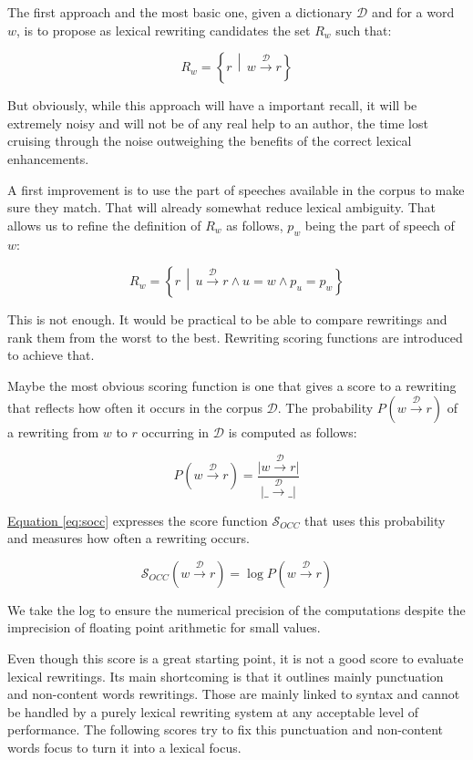 \documentclass[a4paper, 11pt, onepage]{scrreprt}
\newcommand\equaref[1]{\hyperref[#1]{Equation \ref*{#1}}}
\newcommand\maps[1]{\xrightarrow{\mathcal{#1}}}
\newcommand\card[1]{\lvert #1 \rvert}
\newcommand\suchthat{\, \middle| \,}
\newcommand\proba[2][]{P_{#1} \left( #2 \right)}
\begin{document}
The first approach and the most basic one, given a dictionary
$\mathcal{D}$ and for a word $w$, is to propose as lexical rewriting
candidates the set $R_w$ such that:

\[
R_w = \left\{r \suchthat w \maps{D} r\right\}
\]

But obviously, while this approach will have a important recall, it
will be extremely noisy and will not be of any real help to an author,
the time lost cruising through the noise outweighing the benefits of
the correct lexical enhancements.

A first improvement is to use the part of speeches available in the
corpus to make sure they match. That will already somewhat reduce
lexical ambiguity. That allows us to refine the definition of $R_w$ as
follows, $p_w$ being the part of speech of $w$:

\begin{equation*}
  R_w = \left\{
    r \suchthat u \maps{D} r \land u = w \land p_u = p_w
  \right\}
\end{equation*}

This is not enough. It would be practical to be able to compare
rewritings and rank them from the worst to the best. Rewriting scoring
functions are introduced to achieve that.

Maybe the most obvious scoring function is one that gives a score to a
rewriting that reflects how often it occurs in the corpus
$\mathcal{D}$. The probability $\proba{w \maps{D} r}$ of a rewriting
from $w$ to $r$ occurring in $\mathcal{D}$ is computed as follows:

\begin{equation*}
  \proba{w \maps{D} r} = \frac{\card{w \maps{D} r}}{\card{\_ \maps{D} \_}}
\end{equation*}

\equaref{eq:socc} expresses the score function $\mathcal{S}_{OCC}$
that uses this probability and measures how often a rewriting occurs.

\begin{equation}
  \label{eq:socc}
  \mathcal{S}_{OCC}(w \maps{D} r) = \log \proba{w \maps{D} r}
\end{equation}

We take the log to ensure the numerical precision of the computations
despite the imprecision of floating point arithmetic for small values.

Even though this score is a great starting point, it is not a good
score to evaluate lexical rewritings. Its main shortcoming is that it
outlines mainly punctuation and non-content words rewritings. Those
are mainly linked to syntax and cannot be handled by a purely lexical
rewriting system at any acceptable level of performance. The following
scores try to fix this punctuation and non-content words focus to turn
it into a lexical focus.
\end{document}
